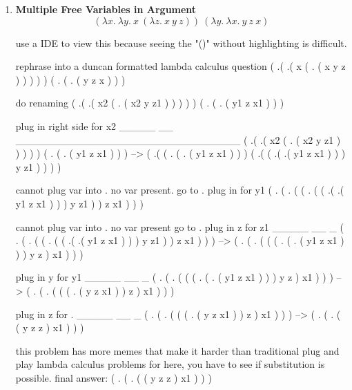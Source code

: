 \documentclass[11pt]{article}
\begin{document}
    \begin{enumerate}
        \item \textbf{Multiple Free Variables in Argument}
        \[
            (\lambda x.\ \lambda y.\ x\ (\lambda z.\ x\ y\ z))\ (\lambda y.\ \lambda x.\ y\ z\ x)
        \]

        \begin{markdown}
            use a IDE to view this because seeing the "()" without highlighting is difficult.

            rephrase into a duncan formatted lambda calculus question
            ( \lx.( \ly.( x ( \lz. ( x y z ) ) ) ) ) ( \ly. ( \lx. ( y z x ) ) )

            do \a renaming
            ( .( \ly.( x2 ( . ( x2 y z1 ) ) ) ) ) ( . ( . ( y1 z x1 ) ) )

            plug in right side for x2
            _____        __                             _______________________________
            ( .( \ly.( x2 ( . ( x2 y z1 ) ) ) ) ) ( . ( . ( y1 z x1 ) ) )
            -->
            ( \ly.( ( . ( . ( y1 z x1 ) ) ) ( .( ( .( .( y1 z x1 ) ) )
            y z1 ) ) ) )

            cannot plug var into \ly. no var present. go to .
            plug in  for y1
            ( \ly. ( . ( ( . ( ( .( .( y1 z x1 ) ) ) y z1 ) ) z x1 ) ) )

            cannot plug var into . no var present go to .
            plug in z for z1
            _____                                   __     _
            ( \ly. ( . ( ( . ( ( .( .( y1 z x1 ) ) ) y z1 ) ) z x1 ) ) )
            -->
            ( \ly. ( . ( ( ( . ( . ( y1 z x1 ) ) ) y z ) x1 ) ) )

            plug in y for y1
            _____           __            _
            ( \ly. ( . ( ( ( . ( . ( y1 z x1 ) ) ) y z ) x1 ) ) )
            -->
            ( \ly. ( . ( ( ( . ( y z x1 ) ) z ) x1 ) ) )

            plug in z for .
            _____       __     _
            ( \ly. ( . ( ( ( . ( y z x1 ) ) z ) x1 ) ) )
            -->
            ( \ly. ( . ( ( y z z ) x1 ) ) )

            this problem has more memes that make it harder than traditional
            plug and play lambda calculus problems
            for here, you have to see if substitution is possible.
            final answer:
            ( \ly. ( . ( ( y z z ) x1 ) ) )
        \end{markdown}


\end{enumerate}
\end{document}
